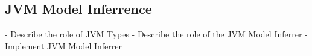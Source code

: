 \subsection{JVM Model Inferrence}

- Describe the role of JVM Types
- Describe the role of the JVM Model Inferrer
- Implement JVM Model Inferrer

